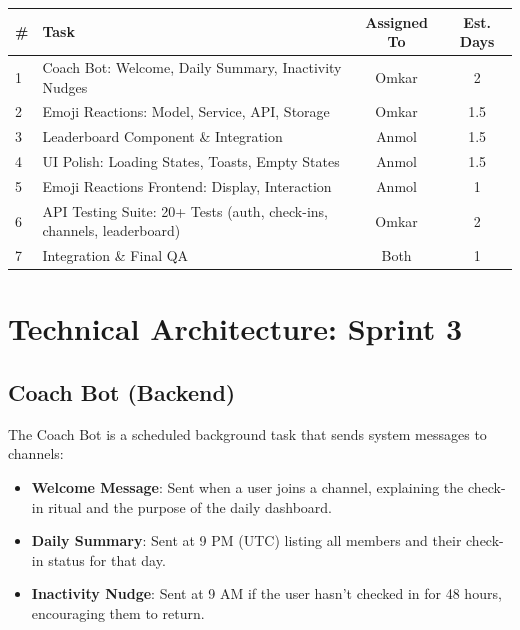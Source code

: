 \documentclass[11pt]{article}
\begin{document}
\begin{center}
\begin{tabularx}{\textwidth}{@{}lXcc@{}}
\toprule
\textbf{\#} & \textbf{Task} & \textbf{Assigned To} & \textbf{Est. Days} \\
\midrule
1 & Coach Bot: Welcome, Daily Summary, Inactivity Nudges & Omkar & 2 \\
2 & Emoji Reactions: Model, Service, API, Storage & Omkar & 1.5 \\
3 & Leaderboard Component \& Integration & Anmol & 1.5 \\
4 & UI Polish: Loading States, Toasts, Empty States & Anmol & 1.5 \\
5 & Emoji Reactions Frontend: Display, Interaction & Anmol & 1 \\
6 & API Testing Suite: 20+ Tests (auth, check-ins, channels, leaderboard) & Omkar & 2 \\
7 & Integration \& Final QA & Both & 1 \\
\bottomrule
\end{tabularx}
\end{center}

\section{Technical Architecture: Sprint 3}

\subsection{Coach Bot (Backend)}

The Coach Bot is a scheduled background task that sends system messages to channels:

\begin{itemize}[leftmargin=1.5em]
    \item \textbf{Welcome Message}: Sent when a user joins a channel, explaining the check-in ritual and the purpose of the daily dashboard.
    \item \textbf{Daily Summary}: Sent at 9 PM (UTC) listing all members and their check-in status for that day.
    \item \textbf{Inactivity Nudge}: Sent at 9 AM if the user hasn't checked in for 48 hours, encouraging them to return.
\end{itemize}
\end{document}
